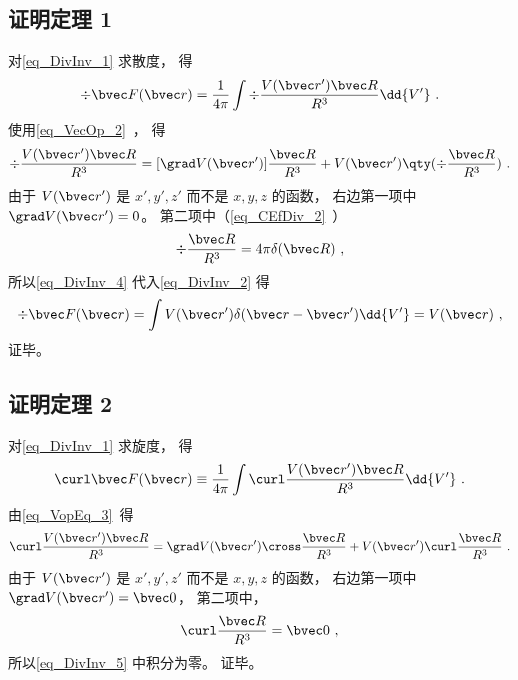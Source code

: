\subsection{证明定理 1}
对\autoref{eq_DivInv_1} 求散度， 得
\begin{equation}\label{eq_DivInv_2}
\div \bvec F(\bvec r) = \frac{1}{4\pi}\int \div \frac{V(\bvec r') \bvec R}{R^3} \dd{V'}~.
\end{equation}
使用\autoref{eq_VecOp_2}~， 得
\begin{equation}\label{eq_DivInv_4}
\div \frac{V(\bvec r') \bvec R}{R^3} = [\grad V(\bvec r')] \frac{ \bvec R}{R^3} + V(\bvec r') \qty(\div \frac{\bvec R}{R^3})~.
\end{equation}
由于 $V(\bvec r')$ 是 $x', y', z'$ 而不是 $x, y, z$ 的函数， 右边第一项中 $\grad V(\bvec r') = 0$。 第二项中（\autoref{eq_CEfDiv_2}~）
\begin{equation}
\div \frac{\bvec R}{R^3} = 4\pi \delta(\bvec R)~,
\end{equation}
所以\autoref{eq_DivInv_4} 代入\autoref{eq_DivInv_2} 得
\begin{equation}
\div \bvec F(\bvec r) = \int V(\bvec r') \delta(\bvec r - \bvec r') \dd{V'} = V(\bvec r)~,
\end{equation}
证毕。

\subsection{证明定理 2}
对\autoref{eq_DivInv_1} 求旋度， 得
\begin{equation}\label{eq_DivInv_5}
\curl \bvec F(\bvec r) \equiv \frac{1}{4\pi}\int \curl \frac{V(\bvec r') \bvec R}{R^3} \dd{V'}~.
\end{equation}
由\autoref{eq_VopEq_3}~得
\begin{equation}
\curl \frac{V(\bvec r') \bvec R}{R^3} = \grad V(\bvec r') \cross \frac{\bvec R}{R^3} + V(\bvec r') \curl \frac{\bvec R}{R^3}~.
\end{equation}
由于 $V(\bvec r')$ 是 $x', y', z'$ 而不是 $x, y, z$ 的函数， 右边第一项中 $\grad V(\bvec r') = \bvec 0$， 第二项中， %
\begin{equation}
\curl \frac{\bvec R}{R^3} = \bvec 0~,
\end{equation}
所以\autoref{eq_DivInv_5} 中积分为零。 证毕。
